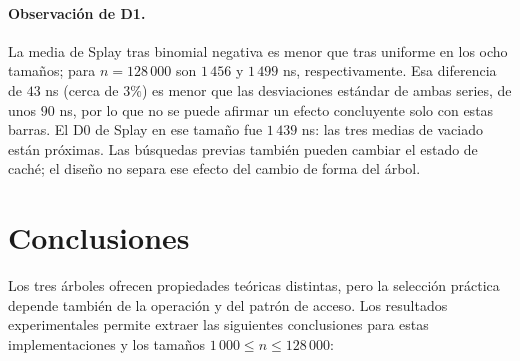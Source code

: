 \documentclass[11pt,letterpaper]{article}
\begin{document}
\paragraph{Observación de D1.}
La media de Splay tras binomial negativa es
menor que tras uniforme en los ocho tamaños; para $n=128\,000$ son $1\,456$
y $1\,499$ ns, respectivamente. Esa diferencia de $43$ ns (cerca de $3\%$)
es menor que las desviaciones estándar de ambas series, de unos $90$ ns, por
lo que no se puede afirmar un efecto concluyente solo con estas barras. El
D0 de Splay en ese tamaño fue $1\,439$ ns: las tres medias de vaciado están
próximas. Las búsquedas previas también pueden cambiar el estado de caché;
el diseño no separa ese efecto del cambio de forma del árbol.

\newpage
\section{Conclusiones}


Los tres árboles ofrecen propiedades teóricas distintas, pero la selección
práctica depende también de la operación y del patrón de acceso. Los resultados experimentales
permite extraer las siguientes conclusiones para estas implementaciones y los tamaños $1\,000\leq n\leq128\,000$:
\end{document}

